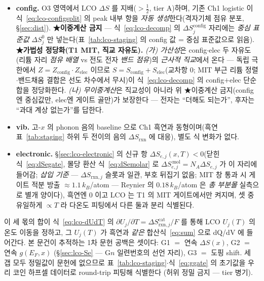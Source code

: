 \documentclass[11pt,a4paper]{article}
\newcommand{\rxn}{\mathrm{rxn}}
\begin{document}
\begin{itemize}[leftmargin=1.4em,itemsep=2pt]
\item \textbf{config.} O3 영역에서 LCO $\Delta S$ 를 지배($>\tfrac12$\cite{reynier2004}, tier A)하며, 기존 Ch1 logistic 이 식~\eqref{eq:lco-configsplit} 의 peak 내부 항을 \emph{자동 생성}한다(격자기체 점유 분포, \S\ref{sec:dist}). \textbf{★이중계산 금지} — 식~\eqref{eq:lco-decomp} 의 $\Delta S_j^\mathrm{config}$ 자리에는 \emph{중심 표준값} $\Delta S_j^0$ 만 넣는다(표~\ref{tab:lco-staging} 의 config 값 = 중심 표준값으로 읽음).
\textbf{★가법성 정당화(T1 MIT, 직교 자유도).} \emph{(가) 가산성}은 config$\cdot$elec 두 자유도(리튬 자리
\emph{점유 배열} vs 전도 전자 \emph{밴드 점유})의 \emph{근사적 직교}에서 온다 — 독립 극한에서
$Z=Z_\mathrm{config}\!\cdot\!Z_\mathrm{elec}$ 이므로 $S=S_\mathrm{config}+S_\mathrm{elec}$(교차항 $0$;
MIT 부근 리튬 정렬$\cdot$밴드채움 결합은 선도 차수에서 무시)이 식~\eqref{eq:lco-decomp} 의 config$+$elec
단순합을 정당화한다. \emph{(나) 무이중계산}은 직교성이 아니라 위 ★이중계산 금지(config엔 중심값만, elec엔
게이트 골만)가 보장한다 — 전자는 ``더해도 되는가'', 후자는 ``과대 계상 없는가''를 답한다.
\item \textbf{vib.} 고-$x$ 의 phonon 음의 baseline 으로 Ch1 흑연과 동형이며(흑연 표~\ref{tab:staging} 하위 두 전이의 음의
$\Delta S_\rxn$ 에 대응), 별도 식 변화가 없다.
\item \textbf{electronic.} \S\ref{sec:lco-electronic} 의 신규 항 $\Delta S_{e,j}(x,T)<0$(닫힌식~\eqref{eq:dSegate},
몰당 환산 식~\eqref{eq:dSemolar} 로 $\Delta S_{e,j}^{\,\mathrm{mol}}=N_A\Delta S_{e,j}$ 가 이 자리에 들어감; \emph{삽입
기준} — $\Delta S_{\rxn,j}$ 슬롯과 일관, 부호 뒤집기 없음; MIT 창 통과 시 게이트 적분 방출 $\approx1.1\,k_B$/atom —
Reynier 의 $0.18\,k_B$/atom 은 \emph{총 부분몰} 실측으로 별개 양이다),
흑연엔 $0$ 이고 LCO 는 T1 의 MIT 게이트에서만 켜지며, 셋 중 유일하게 $\propto T$ 라 다온도 피팅에서 다른 둘과 분리 식별된다.
\end{itemize}
이 세 몫의 합이 식~\eqref{eq:lco-dUdT} 의 $\partial U_j/\partial T=\Delta S_{\rxn,j}^\mathrm{cat}/F$ 를 통해 LCO
$U_j(T)$ 의 온도 이동을 정하고, 그 $U_j(T)$ 가 흑연과 \emph{같은} 합산식~\eqref{eq:sum} 으로 dQ/dV 에 들어간다.
본 문건이 추적하는 1차 문헌 공백은 셋이다: G1 $=$ 연속 $\Delta S(x)$, G2 $=$ 연속 $g(E_F,x)$
(\S\ref{sec:lco-Se} — G$n$ 일련번호의 선언 자리), G3 $=$ 도핑 shift. 세 갭 모두 정밀값이 문헌에 없으므로
표~\ref{tab:lco-staging}$\cdot$식~\eqref{eq:ggate} 의 초기값을 우리 코인 하프셀 데이터로 round-trip 피팅해 식별한다
(허위 정밀 금지 — tier 병기).
\end{document}

